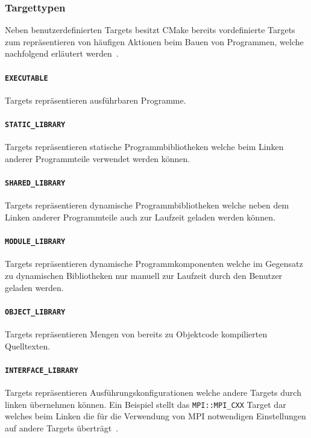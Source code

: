 \documentclass[german,proseminar,hyperref,utf8,lof]{zihpub}
\begin{document}
    \subsubsection{Targettypen}
    Neben benutzerdefinierten Targets besitzt CMake bereits vordefinierte Targets zum repräsentieren
    von häufigen Aktionen beim Bauen von Programmen, welche nachfolgend erläutert
    werden~.

    \paragraph{\texttt{EXECUTABLE}} Targets repräsentieren ausführbaren Programme.

    \paragraph{\texttt{STATIC\_LIBRARY}} Targets repräsentieren statische Programmbibliotheken welche
    beim Linken anderer Programmteile verwendet werden können.

    \paragraph{\texttt{SHARED\_LIBRARY}} Targets repräsentieren dynamische Programmbibliotheken welche
    neben dem Linken anderer Programmteile auch zur Laufzeit geladen werden können.

    \paragraph{\texttt{MODULE\_LIBRARY}} Targets repräsentieren dynamische Programmkomponenten welche
    im Gegensatz zu dynamischen Bibliotheken nur manuell zur Laufzeit durch den Benutzer geladen werden.

    \paragraph{\texttt{OBJECT\_LIBRARY}} Targets repräsentieren Mengen von bereits zu Objektcode
    kompilierten Quelltexten.

    \paragraph{\texttt{INTERFACE\_LIBRARY}} Targets repräsentieren Ausführungskonfigurationen welche andere
    Targets durch linken übernehmen können.
    Ein Beispiel stellt das \texttt{MPI::MPI\_CXX} Target dar welches beim Linken die für die Verwendung
    von MPI notwendigen Einstellungen auf andere Targets überträgt~.
\end{document}
